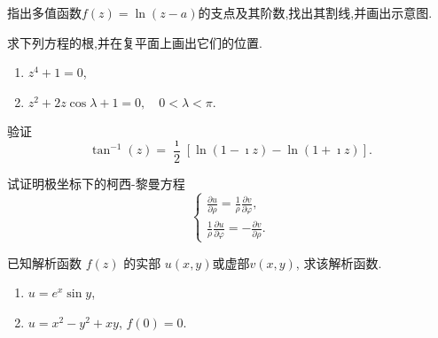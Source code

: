 \documentclass[10pt]{article}
\newenvironment{problem}[2][]{\begin{trivlist}
\item[\hskip \labelsep {\bfseries #1}\hskip \labelsep {\bfseries #2}]}{\end{trivlist}}
\begin{document}
\begin{problem}{1.5}
  指出多值函数$f(z) = \ln{(z-a)}$的支点及其阶数,找出其割线,并画出示意图.
\end{problem}


\begin{problem}{1.5}
  求下列方程的根,并在复平面上画出它们的位置.
  \begin{enumerate}
    \item $z^4 + 1 = 0$,
    \item $z^2 + 2 z \cos \lambda + 1 = 0, \quad 0 < \lambda < \pi$.
  \end{enumerate}
\end{problem}

\begin{problem}{1.6}
验证
$$
\tan^{-1}(z)=\frac{\imath }{2}[\ln (1-\imath z)-\ln (1+\imath z)] .
$$
\end{problem}


\begin{problem}{1.7}
  试证明极坐标下的柯西-黎曼方程
  $$
    \left\{\begin{array}{l}
    \frac{\partial u}{\partial \rho}=\frac{1}{\rho} \frac{\partial v}{\partial \varphi} ,\\
    \frac{1}{\rho} \frac{\partial u}{\partial \varphi}=-\frac{\partial v}{\partial \rho} .
    \end{array}\right.
  $$
\end{problem}

\begin{problem}{1.8}
  已知解析函数 $f(z)$  的实部 $u(x, y)$或虚部$ v(x, y)$, 求该解析函数.
  \begin{enumerate}
    \item $u = e^x \sin{y}$,
    \item $u = x^2 - y^2 + xy$, $f(0) = 0$.
  \end{enumerate}
\end{problem}

\end{document}
